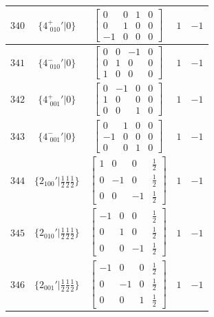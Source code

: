 \documentclass[fleqn,8pt]{jsarticle}
\begin{document}
\begin{longtable}{ccccc}
$ 340 $ & $ \{4^{+}_{\,\,010}{}'|0\} $ & $ \begin{bmatrix} 0 & 0 & 1 & 0 \\ 0 & 1 & 0 & 0 \\ -1 & 0 & 0 & 0 \end{bmatrix} $ & $ 1 $ & $ -1 $ \\ \hline
$ 341 $ & $ \{4^{-}_{\,\,010}{}'|0\} $ & $ \begin{bmatrix} 0 & 0 & -1 & 0 \\ 0 & 1 & 0 & 0 \\ 1 & 0 & 0 & 0 \end{bmatrix} $ & $ 1 $ & $ -1 $ \\ \hline
$ 342 $ & $ \{4^{+}_{\,\,001}{}'|0\} $ & $ \begin{bmatrix} 0 & -1 & 0 & 0 \\ 1 & 0 & 0 & 0 \\ 0 & 0 & 1 & 0 \end{bmatrix} $ & $ 1 $ & $ -1 $ \\ \hline
$ 343 $ & $ \{4^{-}_{\,\,001}{}'|0\} $ & $ \begin{bmatrix} 0 & 1 & 0 & 0 \\ -1 & 0 & 0 & 0 \\ 0 & 0 & 1 & 0 \end{bmatrix} $ & $ 1 $ & $ -1 $ \\ \hline
$ 344 $ & $ \{2{}_{100}{}'|\frac{1}{2} \frac{1}{2} \frac{1}{2}\} $ & $ \begin{bmatrix} 1 & 0 & 0 & \frac{1}{2} \\ 0 & -1 & 0 & \frac{1}{2} \\ 0 & 0 & -1 & \frac{1}{2} \end{bmatrix} $ & $ 1 $ & $ -1 $ \\ \hline
$ 345 $ & $ \{2{}_{010}{}'|\frac{1}{2} \frac{1}{2} \frac{1}{2}\} $ & $ \begin{bmatrix} -1 & 0 & 0 & \frac{1}{2} \\ 0 & 1 & 0 & \frac{1}{2} \\ 0 & 0 & -1 & \frac{1}{2} \end{bmatrix} $ & $ 1 $ & $ -1 $ \\ \hline
$ 346 $ & $ \{2{}_{001}{}'|\frac{1}{2} \frac{1}{2} \frac{1}{2}\} $ & $ \begin{bmatrix} -1 & 0 & 0 & \frac{1}{2} \\ 0 & -1 & 0 & \frac{1}{2} \\ 0 & 0 & 1 & \frac{1}{2} \end{bmatrix} $ & $ 1 $ & $ -1 $ \\ \hline

\end{longtable}
\end{document}
